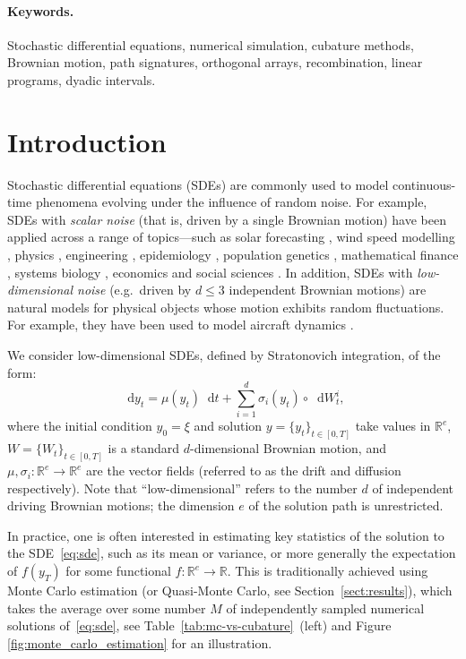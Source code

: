 \documentclass[11pt, letterpaper]{article}
\theoremstyle{definition}
\theoremstyle{remark}
\newcommand{\R}{\mathbb{R}}
\newcommand{\diff}{\mathop{}\!\mathrm{d}}
\begin{document}
\paragraph{Keywords.}
Stochastic differential equations, numerical simulation, cubature methods, Brownian motion, path signatures, orthogonal arrays, recombination, linear programs, dyadic intervals.

\section{Introduction}

Stochastic differential equations (SDEs) are commonly used to model continuous-time phenomena evolving under the influence of random noise. For example, SDEs with \emph{scalar noise} (that is, driven by a single Brownian motion) have been applied across a range of topics---such as
solar forecasting \cite{badosa2018solar, iversen2014solar, chaabane2025solar}, wind speed modelling \cite{arenaslopez2020wind}, physics \cite{rehman2023optics}, engineering \cite{wang2022sdes}, epidemiology \cite{cai2015sirs, maki2013sir}, population genetics \cite{czuppon2021genetics}, mathematical finance \cite{cox1985cir}, systems biology \cite{vaisband2025nsdes}, economics \cite{chen2025wealth} and social sciences \cite[chapter 2]{cobb1981socialsdes}. In addition, SDEs with \emph{low-dimensional noise} (e.g.~driven by $d\leq 3$ independent Brownian motions) are natural models for physical objects whose motion exhibits random fluctuations. For example, they have been used to model aircraft dynamics \cite{li2023aircraft, liu2021aircraft}.

We consider low-dimensional SDEs, defined by Stratonovich integration, of the form:
\begin{equation}
    \diff y_{t} = \mu(y_{t}) \diff t + \sum_{i=1}^d \sigma_i(y_{t}) \circ \diff W_t^i,
    \label{eq:sde}
\end{equation}
where the initial condition $y_{0} = \xi$ and solution $y = \{y_t\}_{t \in [0, T]}$ take values in $\R^e$, $W = \{W_{t}\}_{t\in [0,T]}$ is a standard $d$-dimensional Brownian motion, and $\mu,\sigma_i : \R^e \to \R^e$ are the vector fields (referred to as the drift and diffusion respectively). Note that ``low-dimensional'' refers to the number $d$ of independent driving Brownian motions; the dimension $e$ of the solution path is unrestricted.

In practice, one is often interested in estimating key statistics of the solution to the SDE~\eqref{eq:sde}, such as its mean or variance, or more generally the expectation of $f(y_T)$ for some functional $f\colon \R^e \to \R$. This is traditionally achieved using Monte Carlo estimation (or Quasi-Monte Carlo, see Section~\ref{sect:results}), which takes the average over some number $M$ of independently sampled numerical solutions of~\eqref{eq:sde}, see Table~\ref{tab:mc-vs-cubature}~(left) and Figure \ref{fig:monte_carlo_estimation} for an illustration.
\end{document}

